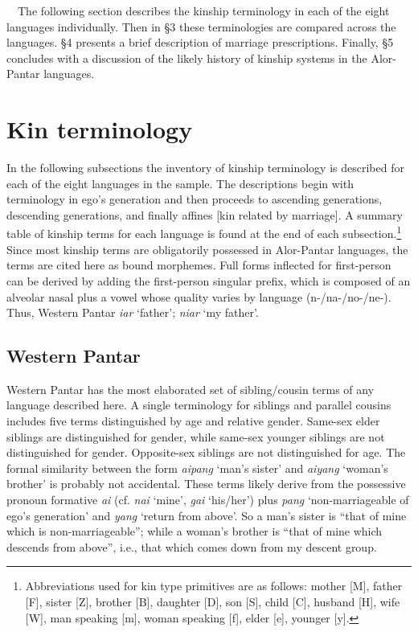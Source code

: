 \ \ The following section describes the kinship terminology in each of the eight languages individually. Then in {\S}3 these terminologies are compared across the languages. {\S}4 presents a brief description of marriage prescriptions. Finally, {\S}5 concludes with a discussion of the likely history of kinship systems in the Alor-Pantar languages. 

\clearpage\section[Kin terminology]{Kin terminology}
\hypertarget{RefHeading78015871885726}{}In the following subsections the inventory of kinship terminology is described for each of the eight languages in the sample. The descriptions begin with terminology in ego{\textquoteright}s generation and then proceeds to ascending generations, descending generations, and finally affines [kin related by marriage]. A summary table of kinship terms for each language is found at the end of each subsection.\footnote{ Abbreviations used for kin type primitives are as follows: mother [M], father [F], sister [Z], brother [B], daughter [D], son [S], child [C], husband [H], wife [W], man speaking [m], woman speaking [f], elder [e], younger [y]. }  Since most kinship terms are obligatorily possessed in Alor-Pantar languages, the terms are cited here as bound morphemes. Full forms inflected for first-person can be derived by adding the first-person singular prefix, which is composed of an alveolar nasal plus a vowel whose quality varies by language (n-/na-/no-/ne-). Thus, 
Western Pantar \textit{iar} {\textquoteleft}father{\textquoteright}; \textit{niar} {\textquoteleft}my father{\textquoteright}.

\subsection[Western Pantar]{Western Pantar}
\hypertarget{RefHeading78017871885726}{}Western Pantar has the most elaborated set of sibling/cousin terms of any language described here. A single terminology for siblings and parallel cousins includes five terms distinguished by age and relative gender. Same-sex elder siblings are distinguished for gender, while same-sex younger siblings are not distinguished for gender. Opposite-sex siblings are not distinguished for age. The formal similarity between the form \textit{aipang} {\textquoteleft}man{\textquoteright}s sister{\textquoteright} and \textit{aiyang }{\textquoteleft}woman{\textquoteright}s brother{\textquoteright} is probably not accidental. These terms likely derive from the possessive pronoun formative \textit{ai} (cf. \textit{nai }{\textquoteleft}mine{\textquoteright}, \textit{gai} {\textquoteleft}his/her{\textquoteright}) plus \textit{pang} {\textquoteleft}non-marriageable of ego{\textquoteright}s generation{\textquoteright} and \textit{yang }{\textquoteleft}return from above{\textquoteright}. 
So a man{\textquoteright}s sister is {\textquotedblleft}that of mine which is non-marriageable{\textquotedblright}; while a woman{\textquoteright}s brother is {\textquotedblleft}that of mine which descends from above{\textquotedblright}, i.e., that which comes down from my descent group. 

